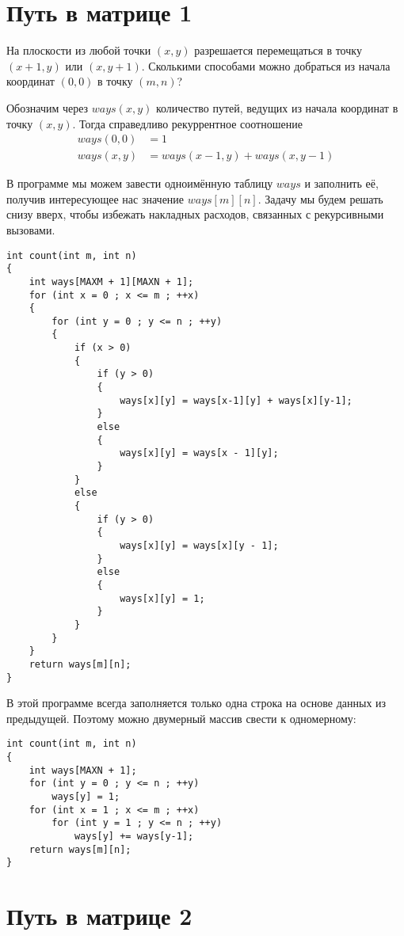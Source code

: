 \documentclass[14pt,openany]{book}
\begin{document}
\section{Путь в матрице 1}

На плоскости из любой точки $(x, y)$ разрешается перемещаться в точку $(x+1,y)$ или $(x,y+1)$.
Сколькими способами можно добраться из начала координат $(0,0)$ в точку $(m,n)$?

Обозначим через $ways(x,y)$ количество путей, ведущих из начала координат в точку $(x,y)$.
Тогда справедливо рекуррентное соотношение
\begin{align*}
ways(0,0) &= 1 \\
ways(x,y) &= ways(x-1,y) + ways(x,y-1)
\end{align*}

В программе мы можем завести одноимённую таблицу $ways$ и заполнить её, получив интересующее
нас значение $ways[m][n]$. Задачу мы будем решать снизу вверх, чтобы избежать накладных
расходов, связанных с рекурсивными вызовами.

\begin{lstlisting}
int count(int m, int n)
{
    int ways[MAXM + 1][MAXN + 1];
    for (int x = 0 ; x <= m ; ++x)
    {
        for (int y = 0 ; y <= n ; ++y)
        {
            if (x > 0)
            {
                if (y > 0)
	            {
                    ways[x][y] = ways[x-1][y] + ways[x][y-1];
	            }
                else
                {
                    ways[x][y] = ways[x - 1][y];
                }
            }
            else
            {
                if (y > 0)
                {
                    ways[x][y] = ways[x][y - 1];
                }
                else
                {
                    ways[x][y] = 1;
                }
            }
        }
    }
    return ways[m][n];
}
\end{lstlisting}

В этой программе всегда заполняется только одна строка на основе данных из предыдущей.
Поэтому можно двумерный массив свести к одномерному:

\begin{lstlisting}
int count(int m, int n)
{
    int ways[MAXN + 1];
    for (int y = 0 ; y <= n ; ++y)
        ways[y] = 1;
    for (int x = 1 ; x <= m ; ++x)
        for (int y = 1 ; y <= n ; ++y)
       	    ways[y] += ways[y-1];
    return ways[m][n];
}
\end{lstlisting}

\section{Путь в матрице 2}
\end{document}
